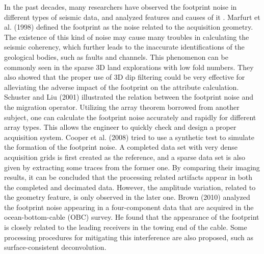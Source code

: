 In the past decades, many researchers have observed the footprint noise in different types of seismic data, and analyzed features and causes of it \cite{Stephen1999plot,John2001ft,Jingye2008tow}. Marfurt et al. (1998) \cite{Marfurt1998ft} defined the footprint as the noise related to the acquisition geometry. The existence of this kind of noise may cause many troubles in calculating the seismic coherency, which further leads to the inaccurate identifications of the geological bodies, such as faults and channels. This phenomenon can be commonly seen in the sparse 3D land explorations with low fold numbers. They also showed that the proper use of 3D dip filtering could be very effective for alleviating the adverse impact of the footprint on the attribute calculation. Schuster and Liu (2001) \cite{Schuster2001ft} illustrated the relation between the footprint noise and the migration operator. Utilizing the array theorem borrowed from another subject, one can calculate the footprint noise accurately and rapidly for different array types. This allows the engineer to quickly check and design a proper acquisition system. Cooper et al. (2008) \cite{Joanna2008num} tried to use a synthetic test to simulate the formation of the footprint noise. A completed data set with very dense acquisition grids is first created as the reference, and a sparse data set is also given by extracting some traces from the former one. By comparing their imaging results, it can be concluded that the processing related artifacts appear in both the completed and decimated data. However, the amplitude variation, related to the geometry feature, is only observed in the later one. Brown (2010) \cite{Brown2010obc} analyzed the footprint noise appearing in a four-component data that are acquired in the ocean-bottom-cable (OBC) survey. He found that the appearance of the footprint is closely related to the leading receivers in the towing end of the cable. Some processing procedures for mitigating this interference are also proposed, such as surface-consistent deconvolution.

